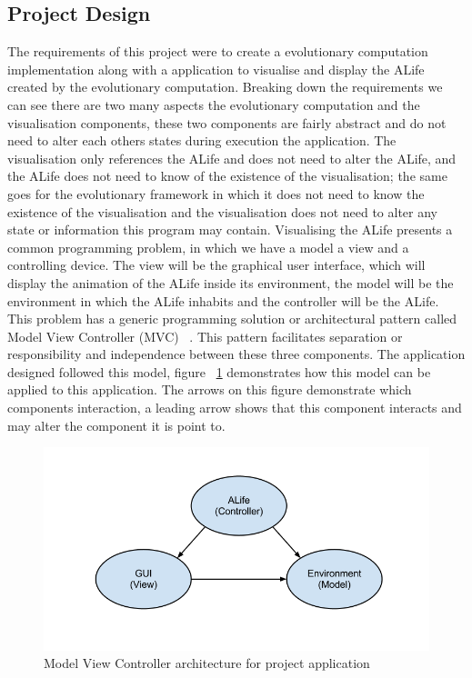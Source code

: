 \documentclass[12pt]{article}
\begin{document}
\subsection{Project Design}
The requirements of this project were to create a evolutionary computation implementation along with a application to visualise and
display the ALife created by the evolutionary computation. Breaking down the requirements we can see there are two many aspects
the evolutionary computation and the visualisation components, these two components are fairly abstract and do not need to alter
each others states during execution the application. The visualisation only references the ALife and does not need to alter
the ALife, and the ALife does not need to know of the existence of the visualisation; the same goes for the evolutionary framework
in which it does not need to know the existence of the visualisation and the visualisation does not need to alter any state or
information this program may contain. Visualising the ALife presents a common programming problem, in which we have a model a view and a controlling
device. The view will be the graphical user interface, which will display the animation of the ALife inside its environment, the 
model will be the environment in which the ALife inhabits and the controller will be the ALife. This problem has a generic programming
solution or architectural pattern called Model View Controller (MVC) ~\cite{fowler03}. This pattern facilitates separation or responsibility
and independence between these three components. The application designed followed this model, figure ~\ref{fig:mvc} demonstrates 
how this model can be applied to this application. The arrows on this figure demonstrate which components interaction, a leading arrow
shows that this component interacts and may alter the component it is point to.

\begin{figure} [ht]
\centering
\includegraphics[scale = 0.5]{mvc.png}
\caption{Model View Controller architecture for project application}
\label{fig:mvc}
\end{figure}
\end{document}
